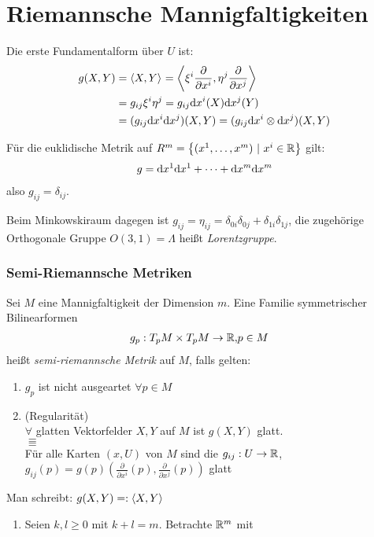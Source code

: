 \documentclass{skript}
\begin{document}
\section{Riemannsche Mannigfaltigkeiten}
Die erste Fundamentalform über $U$ ist:
\begin{align*}
  g(X, Y) &= \sprod{X,Y} = \sprod{\xi^i\frac{\partial}{\partial
  x^i},\eta^j\frac{\partial}{\partial x^j}} \\
  &= g_{ij}\xi^i\eta^j = g_{ij}\d x^i(X)\d x^j(Y) \\
  &= (g_{ij}\d x^i\d x^j)(X,Y) = (g_{ij}\d x^i \otimes \d x^j)(X,Y)
\end{align*}

Für die euklidische Metrik auf $R^m = \mdef[(x^1,\ldots,x^m)]{x^i\in \R}$ gilt:
\begin{align*}
  g = \mathrm d x^1 \mathrm d x^1 + \cdots + \mathrm d x^m\mathrm d x^m
\end{align*}
also $g_{ij} = \delta_{ij}$.

Beim Minkowskiraum dagegen ist $g_{ij} = \eta_{ij} =
\delta_{0i}\delta_{0j} + \delta_{1i}\delta_{1j}$, die zugehörige Orthogonale
Gruppe $O(3,1) = \Lambda$ heißt \emph{Lorentzgruppe}.

\subsubsection{Semi-Riemannsche Metriken}
\begin{dfn}
  Sei $M$ eine Mannigfaltigkeit der Dimension $m$. Eine Familie symmetrischer
  Bilinearformen
  \begin{align*}
    g_p : T_pM\times T_pM\to \mathbb{R}, & p\in M
  \end{align*}
  heißt \emph{semi-riemannsche Metrik} auf $M$, falls gelten:
  \begin{enumerate}
    \item $g_p$ ist nicht ausgeartet $\forall p\in M$
    \item (Regularität)\\
      $\forall$ glatten Vektorfelder $X,Y$ auf $M$ ist $g(X,Y)$ glatt. \\
      $\Equiv$\\
      Für alle Karten $(x,U)$ von $M$ sind die $g_{ij}:U\to \mathbb{R}$,
      $g_{ij}(p) = g(p)\left( \frac{\partial}{\partial x^i}(p),
      \frac{\partial}{\partial x^j}(p) \right)$ glatt
  \end{enumerate}
  Man schreibt: $g(X,Y) =: \sprod{X,Y}$
\end{dfn}
\begin{bsps}
  \begin{enumerate}
    \item Seien $k,l\geq 0$ mit $k+l=m$. Betrachte $\mathbb{R}^m$ mit 
  \end{enumerate}
\end{bsps}
\end{document}
